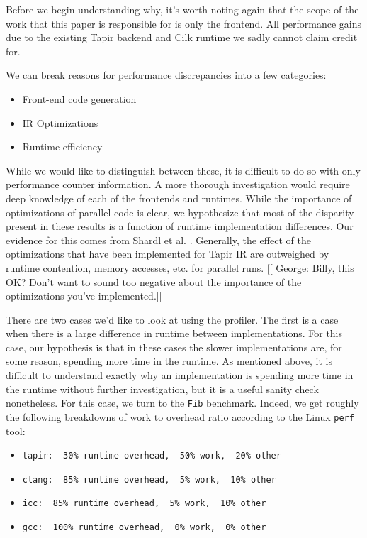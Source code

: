 \documentclass[sigconf]{acmart}
\newcommand{\gsnote}[1]{{\scriptsize \color{blue} [[ George: #1]]}}
\begin{document}
Before we begin understanding why, it's worth noting again that the scope of the 
work that this paper is responsible for is only the frontend. All performance
gains due to the existing Tapir backend and Cilk runtime we sadly cannot claim
credit for. 

We can break reasons for performance discrepancies into a few categories: 

\begin{itemize}
\item Front-end code generation
\item IR Optimizations
\item Runtime efficiency
\end{itemize}

While we would like to distinguish between these, it is difficult to do so with
only performance counter information. A more thorough investigation would
require deep knowledge of each of the frontends and runtimes. While the
importance of optimizations of parallel code is clear, we hypothesize that most
of the disparity present in these results is a function of runtime
implementation differences. Our evidence for this comes from Shardl et al.
\cite{tapir}. Generally, the effect of the optimizations that have been
implemented for Tapir IR are outweighed by runtime contention, memory accesses,
etc. for parallel runs. \gsnote{Billy, this OK? Don't want to sound too
negative about the importance of the optimizations you've implemented.}

There are two cases we'd like to look at using the profiler. The first is a 
case when there is a large difference in runtime between implementations. For 
this case, our hypothesis is that in these cases the slower implementations
are, for some reason, spending more time in the runtime. As mentioned above, 
it is difficult to understand exactly why an implementation is spending more 
time in the runtime without further investigation, but it is a useful 
sanity check nonetheless. For this case, we turn to the \texttt{Fib} benchmark.
Indeed, we get roughly the following breakdowns of work to overhead ratio
according to the Linux \texttt{perf} tool:

\begin{itemize}
\item \texttt{tapir: ~30\% runtime overhead, ~50\% work, ~20\% other}
\item \texttt{clang: ~85\% runtime overhead, ~5\% work, ~10\% other}
\item \texttt{icc: ~85\% runtime overhead, ~5\% work, ~10\% other}
\item \texttt{gcc: ~100\% runtime overhead, ~0\% work, ~0\% other}
\end{itemize}
\end{document}

